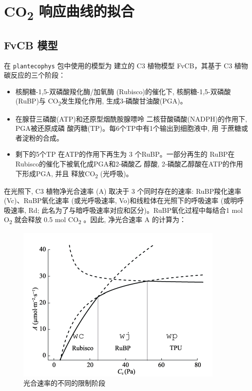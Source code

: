 \documentclass[
]{krantz}
\begin{document}
\cleardoublepage

\hypertarget{response_fit}{%
\chapter{\texorpdfstring{CO\textsubscript{2} 响应曲线的拟合}{CO2 响应曲线的拟合}}\label{response_fit}}

\hypertarget{fvcb_mod}{%
\section{FvCB 模型}\label{fvcb_mod}}

在 \texttt{plantecophys} 包中使用的模型为 \citet{Farquhar1980A} 建立的 C3 植物模型 FvCB，其基于 C3 植物碳反应的三个阶段：

\begin{itemize}
\item
  核酮糖-1,5-双磷酸羧化酶/加氧酶 (Rubisco)的催化下, 核酮糖-1,5-双磷酸(RuBP)与 CO\textsubscript{2}发生羧化作用, 生成3-磷酸甘油酸(PGA)。
\item
  在腺苷三磷酸(ATP)和还原型烟酰胺腺嘌呤 二核苷酸磷酸(NADPH)的作用下, PGA被还原成磷 酸丙糖(TP)。每6个TP中有1个输出到细胞液中,
  用 于蔗糖或者淀粉的合成。
\item
  剩下的5个TP 在ATP的作用下再生为 3 个RuBP。一部分再生的 RuBP在Rubisco的催化下被氧化成PGA和2-磷酸乙 醇酸,
  2-磷酸乙醇酸在ATP的作用下形成PGA, 并且 释放CO\textsubscript{2} (光呼吸)。
\end{itemize}

在光照下, C3 植物净光合速率 (A) 取决于 3 个同时存在的速率: RuBP羧化速率(Vc)、RuBP氧化速率 (或光呼吸速率,
Vo)和线粒体在光照下的呼吸速率 (或明呼吸速率, Rd; 此名为了与暗呼吸速率对应和区分)。RuBP氧化过程中每结合1 mol
O\textsubscript{2} 就会释放 0.5 mol CO\textsubscript{2} 。因此, 净光合速率 A 的计算为：

\begin{figure}
\includegraphics[width=1\linewidth]{images/fvcb} \caption{光合速率的不同的限制阶段}\label{fig:fvcb}
\end{figure}
\end{document}
